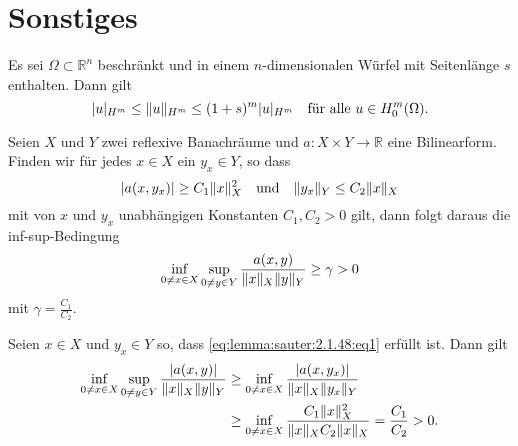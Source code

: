 \section{Sonstiges} %
\label{sec:sonstiges}


\begin{Satz}
\label{satz:grundlagen:poincare_friedrichs_ungleichung}
    Es sei $\Omega \subset \mathbb{R}^{n}$ beschränkt und in einem $n$-dimensionalen Würfel mit Seitenlänge $s$ enthalten.
    Dann gilt
    \begin{equation}
        \label{eq:grundlagen:poincare_friedrichs_ungleichung}
        \lvert u\rvert_{H^{m}} \leq \lVert u\rVert_{H^{m}} \leq (1 + s)^{m} \lvert u\rvert_{H^{m}} \quad \text{für alle}~u \in H^{m}_{0}(\Omega).
    \end{equation}
\end{Satz}

\begin{Lemma}
\label{lemma:sauter:2.1.48}
    Seien $X$ und $Y$ zwei reflexive Banachräume und $a \colon X \times Y \to \mathbb{R}$ eine Bilinearform.
    Finden wir für jedes $x \in X$ ein $y_{x} \in Y$, so dass
    \begin{equation}
        \label{eq:lemma:sauter:2.1.48:eq1}
        \lvert a(x, y_{x})\rvert \geq C_{1} \lVert x\rVert_{X}^{2} \quad \text{und} \quad \lVert y_{x}\rVert_{Y} \leq C_{2} \lVert x\rVert_{X}
    \end{equation}
    mit von $x$ und $y_{x}$ unabhängigen Konstanten $C_{1}, C_{2} > 0$ gilt, dann folgt daraus die inf-sup-Bedingung
    \begin{equation}
    \label{eq:lemma:sauter:2.1.48:inf_sup}
        \inf_{0 \neq x \in X} \sup_{0 \neq y \in Y} \frac{a(x, y)}{\lVert x\rVert_{X}\lVert y\rVert_{Y}} \geq \gamma > 0
    \end{equation}
    mit $\gamma = \frac{C_{1}}{C_{2}}$.

    \begin{Beweis}
        Seien $x \in X$ und $y_{x} \in Y$ so, dass \eqref{eq:lemma:sauter:2.1.48:eq1} erfüllt ist.
        Dann gilt
        \begin{align}
            \inf_{0 \neq x \in X} \sup_{0 \neq y \in Y} \frac{\lvert a(x, y)\rvert}{\lVert x\rVert_{X} \lVert y\rVert_{Y}}
            &\geq
            \inf_{0 \neq x \in X} \frac{\lvert a(x, y_{x})\rvert}{\lVert x\rVert_{X} \lVert y_{x}\rVert_{Y}}
            \\&\geq
            \inf_{0 \neq x \in X} \frac{C_{1} \lVert x\rVert^{2}_{X}}{\lVert x\rVert_{X} C_{2} \lVert x\rVert_{X}}
            =
            \frac{C_{1}}{C_{2}}
            > 0.
        \end{align}
    \end{Beweis}
\end{Lemma}

